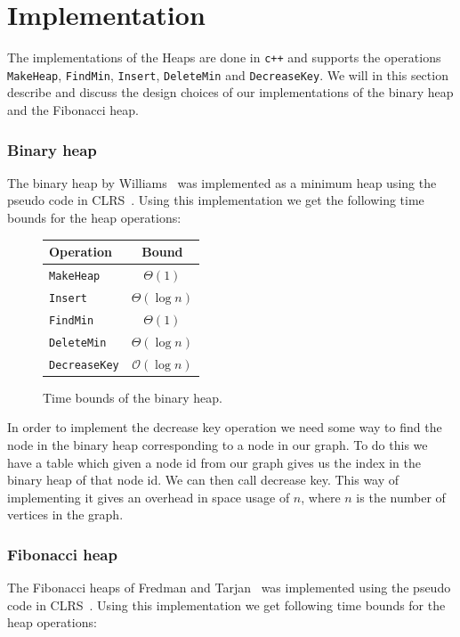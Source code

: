 \documentclass[a4paper,oneside,article,11pt]{memoir}
\begin{document}
\chapter{Implementation}
\label{cpt:implementation}
The implementations of the Heaps are done in \texttt{c++} and supports the operations \texttt{MakeHeap}, \texttt{FindMin}, \texttt{Insert}, \texttt{DeleteMin} and \texttt{DecreaseKey}. We will in this section describe and discuss the design choices of our implementations of the binary heap and the Fibonacci heap.

\subsection{Binary heap}
The binary heap by Williams~\cite{williams} was implemented as a minimum heap using the pseudo code in CLRS~\cite[p.~151-170]{clrs}. Using this implementation we get the following time bounds for the heap operations:

\begin{figure}[H]
\centering
\begin{tabular}{l|c}
Operation & Bound \\\hline
\texttt{MakeHeap} & $\Theta(1)$ \\\hline
\texttt{Insert} & $\Theta(\log n)$ \\\hline
\texttt{FindMin} & $\Theta(1)$ \\\hline
\texttt{DeleteMin} & $\Theta(\log n)$ \\\hline
\texttt{DecreaseKey} & $\mathcal{O}(\log n)$
\end{tabular}
\caption{Time bounds of the binary heap.}
\end{figure}

In order to implement the decrease key operation we need some way to find the node in the binary heap corresponding to a node in our graph. To do this we have a table which given a node id from our graph gives us the index in the binary heap of that node id. We can then call decrease key. This way of implementing it gives an overhead in space usage of $n$, where $n$ is the number of vertices in the graph.

\subsection{Fibonacci heap}

The Fibonacci heaps of Fredman and Tarjan~\cite{fred87} was implemented using the pseudo code in CLRS~\cite[p.~505-522]{clrs}. Using this implementation we get following time bounds for the heap operations:
\end{document}
